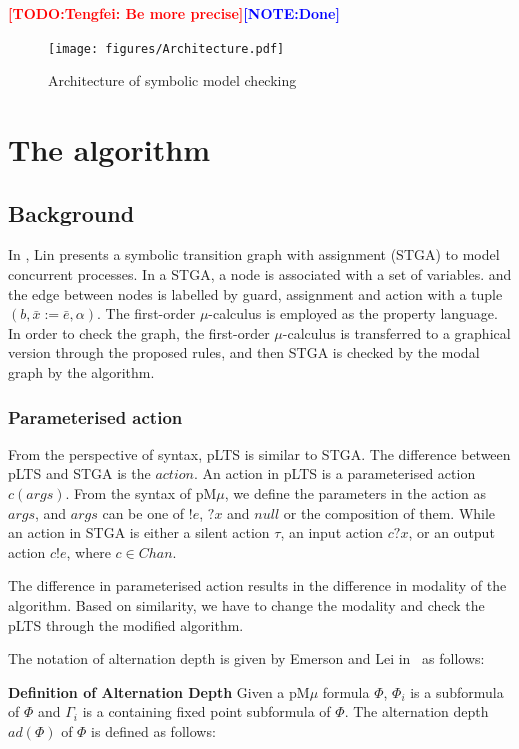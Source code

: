 \documentclass[runningheads,a4paper]{llncs}
\newcommand{\TODO}[1]{\textcolor{red}{\textbf{[TODO:#1]}}}
\newcommand{\NOTE}[1]{\textcolor{blue}{\textbf{[NOTE:#1]}}}
\begin{document}
\TODO{Tengfei: Be more precise}\NOTE{Done}


\begin{figure}
    \centering\texttt{[image: figures/Architecture.pdf]}
    \caption{Architecture of symbolic model checking}
    \label{architectrue}
\end{figure}



\section{The algorithm}\label{algorithm}

\subsection{Background}

 In \cite{lin1996stga}, Lin presents a symbolic transition graph with assignment (STGA) to model concurrent processes. In a STGA, a node is associated with a set of variables. and the edge between nodes is labelled by guard, assignment and action with a tuple $(b, \bar{x}:=\bar{e}, \alpha)$. The first-order $\mu$-calculus is employed as the property language. In order to check the graph, the first-order $\mu$-calculus is transferred to a graphical version through the proposed rules, and then STGA is checked by the modal graph by the algorithm.
 

 
 \subsubsection{Parameterised action}
From the perspective of syntax, pLTS is similar to STGA. The difference between pLTS and STGA is the $\mathit{action}$. An action in pLTS is a parameterised action $c(args)$. From the syntax of pM$\mu$, we define the parameters in the action as $args$, and $args$ can be one of $!e$, $?x$ and $null$ or the composition of them. While an action in STGA is either a silent action $\tau$, an input action $c?x$, or an output action $c!e$, where $c\in Chan$. 

The difference in parameterised action results in the difference in modality of the algorithm. Based on similarity, we have to change the modality and check the pLTS through the modified algorithm.  

The notation of alternation depth is given by Emerson and Lei in~\cite{emerson1986alternation} as follows:

\textbf{Definition of Alternation Depth}
Given a pM$\mu$ formula $\Phi$, $\Phi_{i}$ is a subformula of $\Phi$ and $\Gamma_{i}$ is a containing fixed point subformula of $\Phi$. The alternation depth $ad(\Phi)$ of $\Phi$ is defined as follows:
\end{document}
